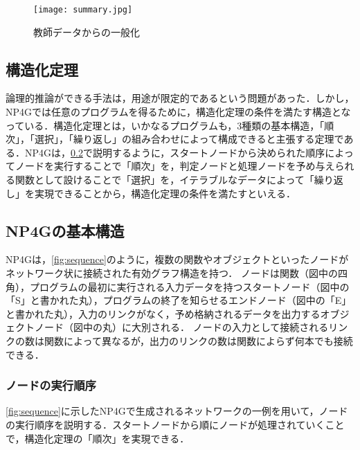 \documentclass[exploratorypaper]{jsaiart} %
\begin{document}
\begin{figure}[t]
    \begin{center}
        \texttt{[image: summary.jpg]}
    \end{center}
    \capwidth=80mm %
    \caption{教師データからの一般化}
    \label{fig:summary}
\end{figure}

\subsection{構造化定理}
論理的推論ができる手法は，用途が限定的であるという問題があった．しかし，NP4Gでは任意のプログラムを得るために，構造化定理の条件を満たす構造となっている．構造化定理とは，いかなるプログラムも，3種類の基本構造，「順次」，「選択」，「繰り返し」の組み合わせによって構成できると主張する定理である\cite{StructuredProgramming}．NP4Gは，\ref{sec:struct}で説明するように，スタートノードから決められた順序によってノードを実行することで「順次」を，判定ノードと処理ノードを予め与えられる関数として設けることで「選択」を，イテラブルなデータによって「繰り返し」を実現できることから，構造化定理の条件を満たすといえる．

\subsection{NP4Gの基本構造}
\label{sec:struct}
NP4Gは，\ref{fig:sequence}のように，複数の関数やオブジェクトといったノードがネットワーク状に接続された有効グラフ構造を持つ．
ノードは関数（図中の四角），プログラムの最初に実行される入力データを持つスタートノード（図中の「S」と書かれた丸），プログラムの終了を知らせるエンドノード（図中の「E」と書かれた丸），入力のリンクがなく，予め格納されるデータを出力するオブジェクトノード（図中の丸）に大別される．
ノードの入力として接続されるリンクの数は関数によって異なるが，出力のリンクの数は関数によらず何本でも接続できる．
\subsubsection{ノードの実行順序}
\label{sec:sequence}
\ref{fig:sequence}に示したNP4Gで生成されるネットワークの一例を用いて，ノードの実行順序を説明する．スタートノードから順にノードが処理されていくことで，構造化定理の「順次」を実現できる．
\end{document}
